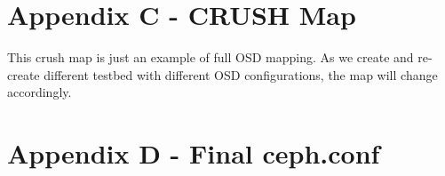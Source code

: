 \documentclass{article}
\begin{document}


\section*{Appendix C - CRUSH Map}

This crush map is just an example of full OSD mapping. As we create and
re-create different testbed with different OSD configurations, the map will
change accordingly.




\section*{Appendix D - Final ceph.conf}


\end{document}
